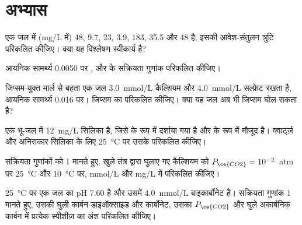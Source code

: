 \section{अभ्यास}

\begin{exercise}[$\star$]\label{exo:b3:water-rock-interaction:1}
एक जल में (\unit{mg/L} में)  48,  9.7,  23,  3.9,
 183,  35.5 और  48 है; इसकी आवेश-संतुलन
त्रुटि परिकलित कीजिए। क्या यह विश्लेषण स्वीकार्य है?
\end{exercise}

\begin{exercise}[$\star$]\label{exo:b3:water-rock-interaction:2}
आयनिक सामर्थ्य 0.0050 पर
,  और  के सक्रियता गुणांक परिकलित कीजिए।
\end{exercise}

\begin{exercise}[$\star$]\label{exo:b3:water-rock-interaction:3}
जिप्सम-युक्त मार्ल से बहता एक जल \qty{3.0}{mmol/L} कैल्शियम और
\qty{4.0}{mmol/L} सल्फ़ेट रखता है, आयनिक सामर्थ्य 0.016 पर। जिप्सम का
 परिकलित कीजिए। क्या यह जल अब भी जिप्सम घोल सकता है?
\end{exercise}

\begin{exercise}[$\star$]\label{exo:b3:water-rock-interaction:4}
एक भू-जल में \qty{12}{mg/L} सिलिका है, जिसे  के रूप में दर्शाया गया है और
 के रूप में मौजूद है। क्वार्ट्ज़ और अनिराकार सिलिका के लिए
\qty{25}{\celsius} पर उसके  परिकलित कीजिए।
\end{exercise}

\begin{exercise}[$\star\star$]\label{exo:b3:water-rock-interaction:5}
सक्रियता गुणांकों को 1 मानते हुए, खुले तंत्र द्वारा घुलाए गए कैल्शियम को
$P_{\ce{CO2}} = 10^{-2}$~atm पर \qty{25}{\celsius} और
\qty{10}{\celsius} पर, \unit{mmol/L} और \unit{mg/L} में परिकलित कीजिए।
\end{exercise}

\begin{exercise}[$\star\star$]\label{exo:b3:water-rock-interaction:6}
\qty{25}{\celsius} पर एक जल का pH 7.60 है और उसमें
\qty{4.0}{mmol/L} बाइकार्बोनेट है। सक्रियता गुणांक 1 मानते हुए, उसकी घुली कार्बन
डाइऑक्साइड और कार्बोनेट, उसका $P_{\ce{CO2}}$ और
घुले अकार्बनिक कार्बन में प्रत्येक स्पीशीज़ का अंश परिकलित कीजिए।
\end{exercise}

